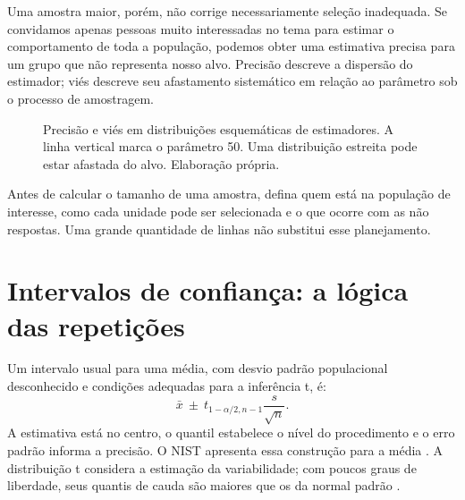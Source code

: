 Uma amostra maior, porém, não corrige necessariamente seleção inadequada. Se convidamos apenas pessoas muito interessadas no tema para estimar o comportamento de toda a população, podemos obter uma estimativa precisa para um grupo que não representa nosso alvo. Precisão descreve a dispersão do estimador; viés descreve seu afastamento sistemático em relação ao parâmetro sob o processo de amostragem.

\begin{figure}[H]
\centering
{}
\caption{Precisão e viés em distribuições esquemáticas de estimadores. A linha vertical marca o parâmetro 50. Uma distribuição estreita pode estar afastada do alvo. Elaboração própria.}
\label{fig:vies-precisao}
\end{figure}

Antes de calcular o tamanho de uma amostra, defina quem está na população de interesse, como cada unidade pode ser selecionada e o que ocorre com as não respostas. Uma grande quantidade de linhas não substitui esse planejamento.

\section{Intervalos de confiança: a lógica das repetições}

Um intervalo usual para uma média, com desvio padrão populacional desconhecido e condições adequadas para a inferência t, é:
\[
\bar{x}\ \pm\ t_{1-\alpha/2,n-1}\frac{s}{\sqrt{n}}.
\]
A estimativa está no centro, o quantil estabelece o nível do procedimento e o erro padrão informa a precisão. O NIST apresenta essa construção para a média \parencite{NISTIntervalo}. A distribuição t considera a estimação da variabilidade; com poucos graus de liberdade, seus quantis de cauda são maiores que os da normal padrão \parencite{RTStudent}.

